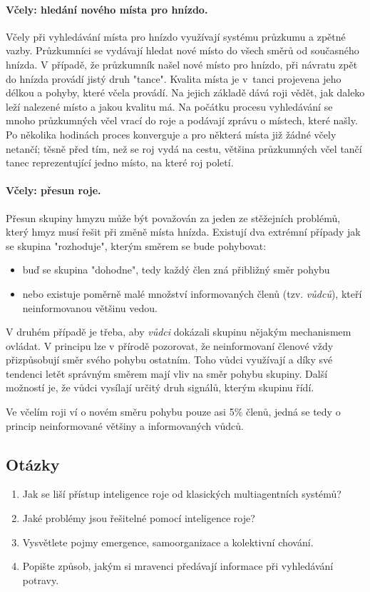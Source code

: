 \documentclass[a4paper,12pt]{article}
\begin{document}
\paragraph{Včely: hledání nového místa pro hnízdo.}
Včely při vyhledávání místa pro hnízdo využívají systému průzkumu a zpětné vazby. Průzkumníci
se vydávají hledat nové místo do všech směrů od současného hnízda. V případě, že průzkumník
našel nové místo pro hnízdo, při návratu zpět do hnízda provádí jistý druh "tance". Kvalita
místa je v~tanci projevena jeho délkou a pohyby, které včela provádí. Na jejich základě dává
roji vědět, jak daleko leží nalezené místo a jakou kvalitu má. Na počátku procesu vyhledávání
se mnoho průzkumných včel vrací do roje a podávají zprávu o místech, které našly. Po několika
hodinách proces konverguje a pro některá místa již žádné včely netančí; těsně před tím, než se
roj vydá na cestu, většina průzkumných včel tančí tanec reprezentující jedno místo, na které
roj poletí.

\paragraph{Včely: přesun roje.}
Přesun skupiny hmyzu může být považován za jeden ze stěžejních problémů, který hmyz musí
řešit při změně místa hnízda. Existují dva extrémní případy jak se skupina "rozhoduje", kterým
směrem se bude pohybovat\cite{Blum08SwarmInt}:
\begin{itemize}
  \item buď se skupina "dohodne", tedy každý člen zná přibližný směr pohybu
  \item nebo existuje poměrně malé množství informovaných členů (tzv. {\it vůdců}), kteří
        neinformovanou většinu vedou.
\end{itemize}
V druhém případě je třeba, aby {\it vůdci} dokázali skupinu nějakým mechanismem ovládat. V principu
lze v přírodě pozorovat, že neinformovaní členové vždy přizpůsobují směr svého pohybu ostatním.
Toho vůdci využívají a díky své tendenci letět správným směrem mají vliv na směr pohybu skupiny.
Další možností je, že vůdci vysílají určitý druh signálů, kterým skupinu řídí.

Ve včelím roji ví o novém směru pohybu pouze asi 5\% členů, jedná se tedy o princip neinformované
většiny a informovaných vůdců.


\subsection{Otázky}
\begin{enumerate}
  \item Jak se liší přístup inteligence roje od klasických multiagentních systémů?
  \item Jaké problémy jsou řešitelné pomocí inteligence roje?
  \item Vysvětlete pojmy emergence, samoorganizace a kolektivní chování.
  \item Popište způsob, jakým si mravenci předávají informace při vyhledávání potravy.
\end{enumerate}
\end{document}
